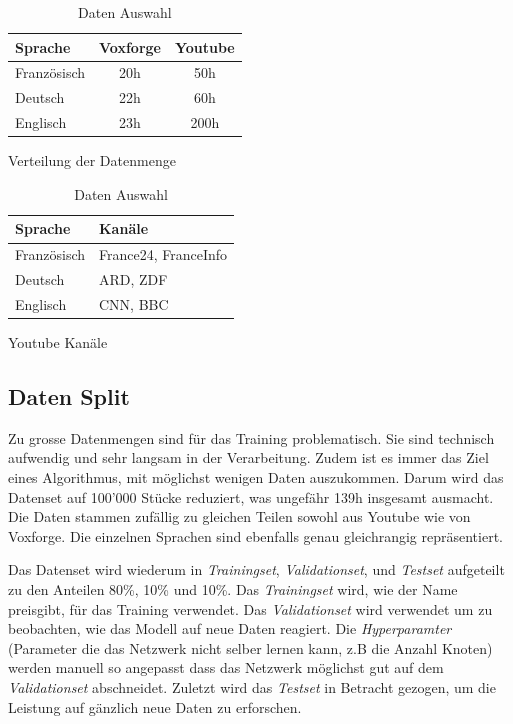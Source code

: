 \begin{table}[h]
    \begin{subtable}[t ]{0.45\textwidth}
        \centering
        \begin{tabular}[t]{l || c c}
        Sprache & Voxforge & Youtube \\
        \hline \hline
        Französisch & 20h & 50h\\
        Deutsch & 22h & 60h\\
        Englisch & 23h & 200h\\
        \end{tabular}
        \caption{Verteilung der Datenmenge}
        \label{tab:amount}
    \end{subtable}
    \hfill
    \begin{subtable}[t ]{0.45\textwidth}
        \centering
        \begin{tabular}[t]{l || l}
        Sprache & Kanäle \\
        \hline \hline
        Französisch & France24, FranceInfo\\
        Deutsch & ARD, ZDF\\
        Englisch & CNN,  BBC
        \end{tabular}
        \caption{Youtube Kanäle}
        \label{tab:channels}
    \end{subtable}
    \caption{Daten Auswahl}
    \label{tab:data}
\end{table}


\subsection{Daten Split}
Zu grosse Datenmengen sind für das Training problematisch. Sie sind technisch aufwendig und sehr langsam in der Verarbeitung. Zudem ist es immer das Ziel eines Algorithmus, mit möglichst wenigen Daten auszukommen. Darum wird das Datenset auf 100'000 Stücke reduziert, was ungefähr 139h insgesamt ausmacht. Die Daten stammen zufällig zu gleichen Teilen sowohl aus Youtube wie von Voxforge. Die einzelnen Sprachen sind ebenfalls genau gleichrangig repräsentiert.

Das Datenset wird wiederum in \textit{Trainingset}, \textit{Validationset}, und \textit{Testset} aufgeteilt zu den Anteilen 80\%, 10\% und 10\%. Das \textit{Trainingset} wird, wie der Name preisgibt, für das Training verwendet. Das \textit{Validationset} wird verwendet um zu beobachten, wie das Modell auf neue Daten reagiert. Die \textit{Hyperparamter} (Parameter die das Netzwerk nicht selber lernen kann, z.B die Anzahl Knoten) werden manuell so angepasst dass das Netzwerk möglichst gut auf dem \textit{Validationset} abschneidet. Zuletzt wird das \textit{Testset} in Betracht gezogen, um die Leistung auf gänzlich neue Daten zu erforschen.

